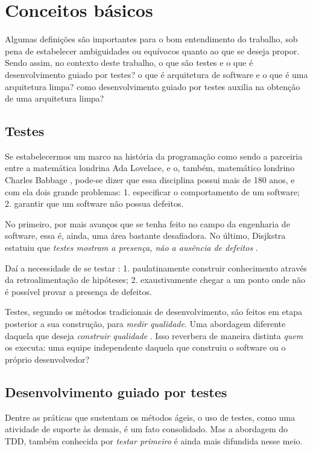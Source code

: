 \section{Conceitos básicos}

  Algumas definições são importantes para o bom entendimento do trabalho, sob pena de estabelecer ambiguidades ou equívocos quanto ao que se deseja propor. Sendo assim, no contexto deste trabalho, o que são testes e o que é desenvolvimento guiado por testes? o que é arquitetura de software e o que é uma arquitetura limpa? como desenvolvimento guiado por testes auxilia na obtenção de uma arquitetura limpa?

  \subsection{Testes}

    Se estabelecermos um marco na história da programação como sendo a parceiria entre a matemática londrina Ada Lovelace, e o, também, matemático londrino Charles Babbage \cite{Huskey1980}, pode-se dizer que essa disciplina possui mais de 180 anos, e com ela dois grande problemas: 1. especificar o comportamento de um software; 2. garantir que um software não possua defeitos.

    No primeiro, por mais avanços que se tenha feito no campo da engenharia de software, essa é, ainda, uma área bastante desafiadora. No último, Disjkstra estatuiu que \emph{testes mostram a presença, não a ausência de defeitos} \cite[pág. 16]{Nato1969}.

    Daí a necessidade de se testar \cite[pág. xxix-xxx]{Mezaros2007}: 1. paulatinamente construir conhecimento através da retroalimentação de hipóteses; 2. exaustivamente chegar a um ponto onde não é possível provar a presença de defeitos.

    Testes, segundo os métodos tradicionais de desenvolvimento, são feitos em etapa posterior a sua construção, para \emph{medir qualidade}. Uma abordagem diferente daquela que deseja \emph{construir qualidade} \cite[pág. 7]{FarcicGarcia2015}. Isso reverbera de maneira distinta \emph{quem} os executa: uma equipe independente daquela que construiu o software ou o próprio desenvolvedor?

  \subsection{Desenvolvimento guiado por testes}

    Dentre as práticas que sustentam os métodos ágeis, o uso de testes, como uma atividade de suporte às demais, é um fato consolidado. Mas a abordagem do TDD, também conhecida por \emph{testar primeiro} é ainda mais difundida nesse  meio.

